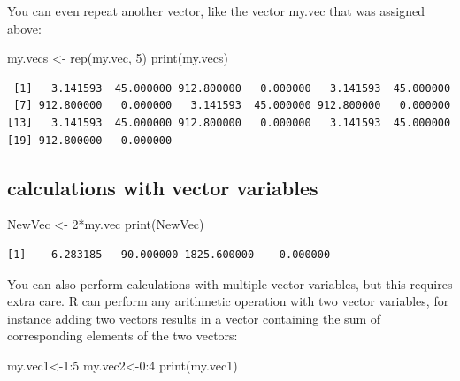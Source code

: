 \documentclass[
  letterpaper,
  DIV=11,
  numbers=noendperiod]{scrreprt}
\newenvironment{Shaded}{\begin{snugshade}}{\end{snugshade}}
\newcommand{\DecValTok}[1]{\textcolor[rgb]{0.68,0.00,0.00}{#1}}
\newcommand{\FunctionTok}[1]{\textcolor[rgb]{0.28,0.35,0.67}{#1}}
\newcommand{\NormalTok}[1]{\textcolor[rgb]{0.00,0.23,0.31}{#1}}
\newcommand{\OtherTok}[1]{\textcolor[rgb]{0.00,0.23,0.31}{#1}}
\newcommand{\SpecialCharTok}[1]{\textcolor[rgb]{0.37,0.37,0.37}{#1}}
\begin{document}
You can even repeat another vector, like the vector my.vec that was
assigned above:

\begin{Shaded}
\begin{Highlighting}[]
\NormalTok{my.vecs }\OtherTok{\textless{}{-}} \FunctionTok{rep}\NormalTok{(my.vec, }\DecValTok{5}\NormalTok{)}
\FunctionTok{print}\NormalTok{(my.vecs)}
\end{Highlighting}
\end{Shaded}

\begin{verbatim}
 [1]   3.141593  45.000000 912.800000   0.000000   3.141593  45.000000
 [7] 912.800000   0.000000   3.141593  45.000000 912.800000   0.000000
[13]   3.141593  45.000000 912.800000   0.000000   3.141593  45.000000
[19] 912.800000   0.000000
\end{verbatim}

\hypertarget{calculations-with-vector-variables}{%
\subsection{calculations with vector
variables}\label{calculations-with-vector-variables}}

\begin{Shaded}
\begin{Highlighting}[]
\NormalTok{NewVec }\OtherTok{\textless{}{-}} \DecValTok{2}\SpecialCharTok{*}\NormalTok{my.vec}
\FunctionTok{print}\NormalTok{(NewVec)}
\end{Highlighting}
\end{Shaded}

\begin{verbatim}
[1]    6.283185   90.000000 1825.600000    0.000000
\end{verbatim}

You can also perform calculations with multiple vector variables, but
this requires extra care. R can perform any arithmetic operation with
two vector variables, for instance adding two vectors results in a
vector containing the sum of corresponding elements of the two vectors:

\begin{Shaded}
\begin{Highlighting}[]
\NormalTok{my.vec1}\OtherTok{\textless{}{-}}\DecValTok{1}\SpecialCharTok{:}\DecValTok{5}
\NormalTok{my.vec2}\OtherTok{\textless{}{-}}\DecValTok{0}\SpecialCharTok{:}\DecValTok{4}
\FunctionTok{print}\NormalTok{(my.vec1)}
\end{Highlighting}
\end{Shaded}
\end{document}
